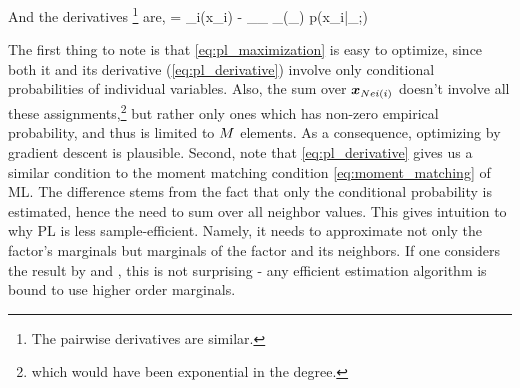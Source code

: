 \eean
And the derivatives \footnote{The pairwise derivatives are similar.} are,
\be
\label{eq:pl_derivative}
 =  \mub_i(x_i) - \sum_{\xx_{}} \mub_{}(\xx_{}) p(x_i|\xx_{};\thetav)
\ee

The first thing to note is that \eqref{eq:pl_maximization} is easy to optimize, since both it and its derivative (\eqref{eq:pl_derivative}) involve only conditional probabilities of individual variables. Also, the sum over $\boldsymbol{x}_{Nei(i)}$ doesn't involve all these assignments,\footnote{which would have been exponential in the degree.} but rather only ones which has non-zero empirical probability, and thus is limited to $M$ elements. 
As a consequence, optimizing by gradient descent is plausible.
Second, note that \eqref{eq:pl_derivative} gives us a similar condition to the moment matching condition \eqref{eq:moment_matching} of ML.
The difference stems from the fact that only the conditional probability is estimated, hence the need to sum over all neighbor values.
This gives intuition to why PL is less sample-efficient. Namely, it needs to approximate not only the factor's marginals but marginals of the factor and its neighbors.
If one considers the result by \cite{bresler2014hardness} and \cite{montanari2015computational}, this is not surprising - any efficient estimation algorithm is bound to use higher order marginals.


